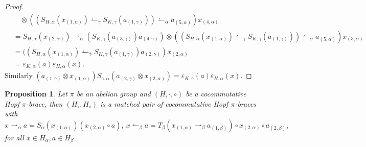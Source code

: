 \documentclass[11pt]{article}
\def\a{\alpha}
\def\b{\beta}
\def\g{\gamma}
\def\o{\otimes}
\def\v{\varepsilon}
\newtheorem{proposition}[theorem]{Proposition}
\begin{document}
\begin{proof}
\begin{align*}
&\quad\o((S_{H,\a}(x_{(1,\a)})\leftharpoonup_{\bar{\g}}S_{K,\g}(a_{(1,\g)}))\leftharpoonup_{\a} a_{(5,\a)})x_{(4,\a)}\\
&=S_{H,\a}(x_{(2,\a)})\rightharpoonup_{\bar{\a}}(S_{K,\g}(a_{(3,\g)})a_{(4,\g)})\o((S_{H,\a}(x_{(1,\a)})\leftharpoonup_{\bar{\g}}S_{K,\g}(a_{(1,\g)}))\leftharpoonup_{\a} a_{(5,\a)})x_{(3,\a)}\\
&=((S_{H,\a}(x_{(1,\a)})\leftharpoonup_{\bar{\g}}S_{K,\g}(a_{(1,\g)})a_{(2,\g)})x_{(2,\a)}\\
&=\v_{K,\a}(a) \v_{H,\a}(x).
\end{align*}
Similarly $(a_{(1,\g)}\o x_{(1,\a)})S_{\g,\a}(a_{(2,\g)}\o x_{(2,\a)})=\v_{K,\g}(a) \v_{H,\a}(x).$
\end{proof}

\begin{proposition}\label{pro:brace}
Let $\pi$ be an abelian group and  $(H,\cdot,\circ)$ be a cocommutative Hopf $\pi$-brace, then $(H_\circ,H_\circ)$ is a matched pair of cocommutative Hopf $\pi$-braces with 
$$x\rightharpoonup_\a a=S_\a(x_{(1,\a)})(x_{(2,\a)}\circ a),\ x\leftharpoonup_\b a=T_\b(x_{(1,\a)}\rightharpoonup_\b a_{(1,\b)})\circ x_{(2,\a)}\circ a_{(2,\b)},$$
for all $x\in H_\a,a\in H_\b$.
\end{proposition}
\end{document}

